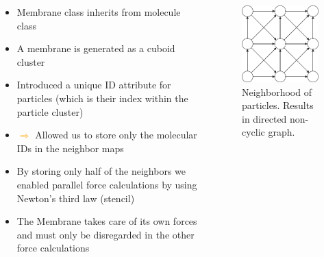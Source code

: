 \begin{frame}
    \begin{columns}
        \begin{column}{0.6\textwidth}
            \begin{itemize}
                \item Membrane class inherits from molecule class
                \item A membrane is generated as a cuboid cluster
                \item Introduced a unique ID attribute for particles (which is their index within the particle cluster)
                \item[] \!\!\!\!\!\!\!\!\! \textcolor{orange}{$\Rightarrow$} Allowed us to store only the molecular IDs in the neighbor maps
                \item By storing only half of the neighbors we enabled parallel force calculations by using Newton's third law (stencil)
                \item The Membrane takes care of its own forces and must only be disregarded in the other force calculations
            \end{itemize}
        \end{column}
        \begin{column}{0.4\textwidth}
            \begin{figure}
                \centering
                \includegraphics[width=0.6\columnwidth]{../../res/membraneNeighbor.drawio}
                \caption{Neighborhood of particles. Results in directed non-cyclic graph.}
                \label{fig:mem}
            \end{figure}
        \end{column}
    \end{columns}

    
\end{frame}